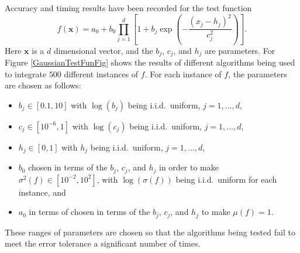 \documentclass[graybox]{svmult}
\newcommand{\vx}{\boldsymbol{x}}
\begin{document}
Accuracy and timing results have been recorded for the test function
\begin{equation} \label{GaussianTestFun}
f(\vx)=a_0 + b_0\prod_{j=1}^d\left[ 1 +b_j \exp \left(-\frac{(x_j-h_j)^2}{c_j^2}\right) \right].
\end{equation}
Here $\vx$ is a $d$ dimensional vector, and the $b_j$, $c_j$, and $h_j$ are parameters.  For Figure \ref{GaussianTestFunFig} shows the results of different algorithms being used to integrate $500$ different instances of $f$.  For each instance of $f$, the parameters are chosen as follows:
\begin{itemize} 
\item $b_j \in [0.1,10]$ with $\log(b_j)$ being i.i.d.\ uniform, $j=1, \ldots, d$,
\item $c_j \in [10^{-6},1]$ with $\log(c_j)$ being i.i.d.\ uniform, $j=1, \ldots, d$,
\item $h_j \in [0,1]$ with $h_j$ being i.i.d.\ uniform, $j=1, \ldots, d$,
\item $b_0$ chosen in terms of the $b_j$, $c_j$, and $h_j$ in order to make $\sigma^2(f) \in [10^{-2}, 10^2]$, with $\log(\sigma(f))$ being i.i.d.\ uniform for each instance, and
\item $a_0$ in terms of chosen in terms of the $b_j$, $c_j$, and $h_j$ to make $\mu(f)=1$.
\end{itemize}
These ranges of parameters are chosen so that the algorithms being tested fail to meet the error tolerance a significant number of times.
\end{document}
